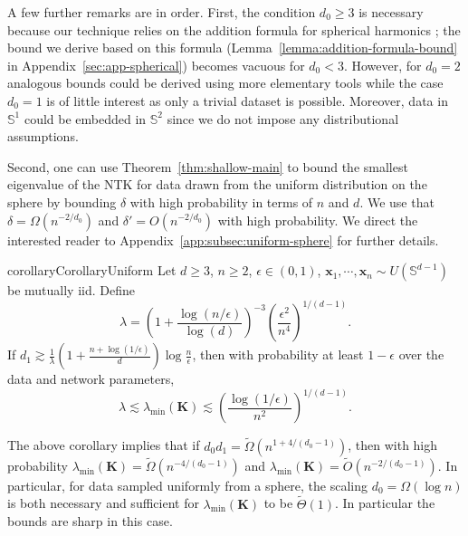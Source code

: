 \documentclass{article}
\theoremstyle{definition}
\renewcommand{\S}{\mathbb{S}}
\def\vx{{\bm{x}}}
\def\mK{{\bm{K}}}
\begin{document}
A few further remarks are in order. 
First, the condition $d_0 \geq 3$ is necessary because our technique relies on 
the addition formula for spherical harmonics \cite[Theorem 4.11]{efthimiou2014spherical}; the bound we derive based on this formula (Lemma~\ref{lemma:addition-formula-bound} in Appendix~\ref{sec:app-spherical}) becomes vacuous for $d_0<3$. However, for $d_0=2$ analogous bounds could be derived using more elementary tools while the case $d_0=1$ is of little interest as only a trivial dataset is possible. Moreover, data in $\S^1$ could be embedded in $\S^2$ since we do not impose any distributional assumptions.


Second, one can use Theorem~\ref{thm:shallow-main} to bound the smallest eigenvalue of the NTK for data drawn from the uniform distribution on the sphere by bounding $\delta$ with high probability in terms of $n$ and $d$. We use that $\delta = \Omega(n^{-2/d_0})$ and $\delta' = O(n^{-2/d_0})$ with high probability. We direct the interested reader to Appendix~\ref{app:subsec:uniform-sphere} for further details. 
\begin{restatable}{corollary}{CorollaryUniform}\label{corr:uniform}
    Let $d\geq 3$, $n \geq 2$, $\epsilon \in (0,1)$, $\vx_1, \cdots, \vx_n \sim U(\S^{d -1})$ be mutually iid. Define
    \[
    \lambda = \left(1 + \frac{\log(n/\epsilon) }{\log(d)} \right)^{-3}\left(\frac{\epsilon^2}{n^4}\right)^{1/(d - 1)}.
    \] 
    If $d_1 \gtrsim \frac{1}{\lambda}\left(1 + \frac{n + \log(1/\epsilon) }{d} \right)\log \frac{n}{\epsilon}$, then with probability at least $1-\epsilon$ over the data and network parameters,
    \[
    \lambda  \lesssim \lambda_{\min}(\mK) \lesssim \left(\frac{\log(1/\epsilon) }{n^2} \right)^{1/(d - 1) }.
    \]
\end{restatable}
The above corollary implies that if $d_0d_1 = \tilde{\Omega}\left(n^{1+4/(d_0-1)} \right)$, then with high probability $\lambda_{\min}(\mK) = \tilde{\Omega}(n^{-4/(d_0 - 1)})$ and $\lambda_{\min}(\mK) = \tilde{O}(n^{-2/(d_0 - 1)})$. In particular, for data sampled uniformly from a sphere, the scaling $d_0 = {\Omega}(\log n)$ is both necessary and sufficient for $\lambda_{\min}(\mK)$ to be $\tilde{\Theta}(1)$. 
In particular the bounds are sharp in this case. 
\end{document}
